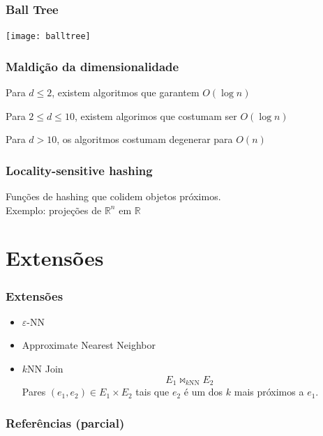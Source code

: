 \documentclass[utf8]{beamer}
\begin{document}
\begin{frame}
    \frametitle{Ball Tree}
    \centering
    \texttt{[image: balltree]}
\end{frame}

\begin{frame}
    \frametitle{Maldição da dimensionalidade}

    Para $d \leq 2$, existem algoritmos que garantem $O(\log n)$

    Para $2 \leq d \leq 10$, existem algorimos que costumam ser $O(\log n)$

    Para $d > 10$, os algoritmos costumam degenerar para $O(n)$

    \nocite{masterThesis} %
\end{frame}

\begin{frame}
    \frametitle{Locality-sensitive hashing}

    Funções de hashing que colidem objetos próximos.
    \\[1em]
    Exemplo: projeções de $\mathbb R^n$ em $\mathbb R$
\end{frame}

\section{Extensões}

\begin{frame}
    \frametitle{Extensões}
    \begin{itemize}
        \item $\varepsilon$-NN
        \pause
        \item Approximate Nearest Neighbor
        \pause
        \item $k$NN Join
            \begin{equation*}
                E_1 \Join_{k\mathrm{NN}} E_2
            \end{equation*}
            Pares $(e_1, e_2) \in E_1 \times E_2$ tais que
            $e_2$ é um dos $k$ mais próximos a $e_1$.
    \end{itemize}
\end{frame}

\begin{frame}
    \frametitle{Referências (parcial)}
    
    
\end{frame}
\end{document}
